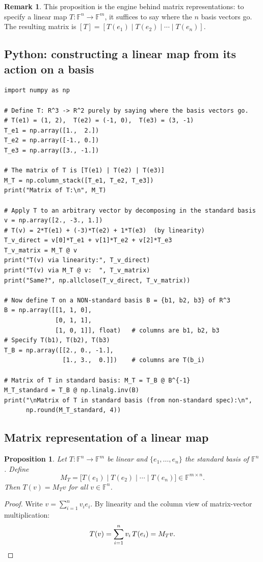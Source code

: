 \documentclass[11pt]{article}
\theoremstyle{definition}
\newtheorem{remark}{Remark}[section]
\theoremstyle{plain}
\newtheorem{proposition}{Proposition}[section]
\begin{document}
\begin{remark}
  This proposition is the engine behind matrix representations: to specify
  a linear map $T:\mathbb{F}^n\to\mathbb{F}^m$, it suffices to say where the
  $n$ basis vectors go.  The resulting matrix is
  $[T] = [T(e_1)\mid T(e_2)\mid\cdots\mid T(e_n)]$.
\end{remark}

\subsection{Python: constructing a linear map from its action on a basis}
\begin{lstlisting}
import numpy as np

# Define T: R^3 -> R^2 purely by saying where the basis vectors go.
# T(e1) = (1, 2),  T(e2) = (-1, 0),  T(e3) = (3, -1)
T_e1 = np.array([1.,  2.])
T_e2 = np.array([-1., 0.])
T_e3 = np.array([3., -1.])

# The matrix of T is [T(e1) | T(e2) | T(e3)]
M_T = np.column_stack([T_e1, T_e2, T_e3])
print("Matrix of T:\n", M_T)

# Apply T to an arbitrary vector by decomposing in the standard basis
v = np.array([2., -3., 1.])
# T(v) = 2*T(e1) + (-3)*T(e2) + 1*T(e3)  (by linearity)
T_v_direct = v[0]*T_e1 + v[1]*T_e2 + v[2]*T_e3
T_v_matrix = M_T @ v
print("T(v) via linearity:", T_v_direct)
print("T(v) via M_T @ v:  ", T_v_matrix)
print("Same?", np.allclose(T_v_direct, T_v_matrix))

# Now define T on a NON-standard basis B = {b1, b2, b3} of R^3
B = np.array([[1, 1, 0],
              [0, 1, 1],
              [1, 0, 1]], float)   # columns are b1, b2, b3
# Specify T(b1), T(b2), T(b3)
T_B = np.array([[2., 0., -1.],
                [1., 3.,  0.]])    # columns are T(b_i)

# Matrix of T in standard basis: M_T = T_B @ B^{-1}
M_T_standard = T_B @ np.linalg.inv(B)
print("\nMatrix of T in standard basis (from non-standard spec):\n",
      np.round(M_T_standard, 4))
\end{lstlisting}

\subsection{Matrix representation of a linear map}

\begin{proposition}
  Let $T:\mathbb{F}^n\to\mathbb{F}^m$ be linear and $\{e_1,\ldots,e_n\}$
  the standard basis of $\mathbb{F}^n$.  Define
  \[
    M_T = \bigl[T(e_1)\mid T(e_2)\mid\cdots\mid T(e_n)\bigr]
    \in\mathbb{F}^{m\times n}.
  \]
  Then $T(v) = M_T v$ for all $v\in\mathbb{F}^n$.
\end{proposition}
\begin{proof}
  Write $v = \sum_{i=1}^n v_i e_i$.  By linearity and the column view of
  matrix-vector multiplication:
  \[
    T(v) = \sum_{i=1}^n v_i\,T(e_i) = M_T v. \qedhere
  \]
\end{proof}
\end{document}
